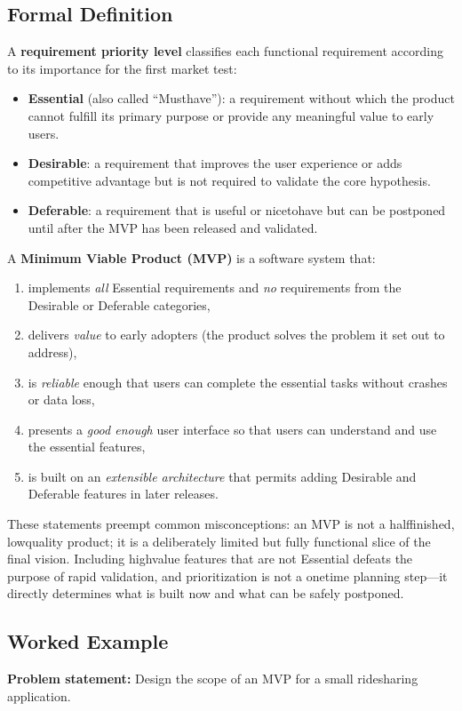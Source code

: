 \documentclass[12pt, a4paper]{article}
\begin{document}
\subsection{Formal Definition}
A \textbf{requirement priority level} classifies each functional requirement according to its importance for the first market test:

\begin{itemize}
  \item \textbf{Essential} (also called ``Musthave''): a requirement without which the product cannot fulfill its primary purpose or provide any meaningful value to early users.
  \item \textbf{Desirable}: a requirement that improves the user experience or adds competitive advantage but is not required to validate the core hypothesis.
  \item \textbf{Deferable}: a requirement that is useful or nicetohave but can be postponed until after the MVP has been released and validated.
\end{itemize}

A \textbf{Minimum Viable Product (MVP)} is a software system that:

\begin{enumerate}
  \item implements \emph{all} Essential requirements and \emph{no} requirements from the Desirable or Deferable categories,
  \item delivers \emph{value} to early adopters (the product solves the problem it set out to address),
  \item is \emph{reliable} enough that users can complete the essential tasks without crashes or data loss,
  \item presents a \emph{good enough} user interface so that users can understand and use the essential features,
  \item is built on an \emph{extensible architecture} that permits adding Desirable and Deferable features in later releases.
\end{enumerate}

These statements preempt common misconceptions: an MVP is not a halffinished, lowquality product; it is a deliberately limited but fully functional slice of the final vision. Including highvalue features that are not Essential defeats the purpose of rapid validation, and prioritization is not a onetime planning step---it directly determines what is built now and what can be safely postponed.  

\subsection{Worked Example}
\textbf{Problem statement:} Design the scope of an MVP for a small ridesharing application.
\end{document}
